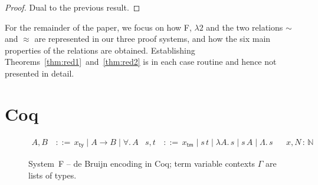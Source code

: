 \documentclass[a4paper,UKenglish]{lipics-v2016}
\makeatletter
\newcommand{\ms}{\,}
\newcommand{\mrel}[1]{\mathrel{\ms #1 \ms}}
\newcommand{\Nat}{\mathbb{N}}
\newcommand{\OF}{\mrel{:}}
\newcommand{\bnfdef}{\mrel{::=}}
\newcommand{\SysL}{$\lambda2$\xspace}
\newcommand{\ty}{\mathsf{ty}}
\newcommand{\tm}{\mathsf{tm}}
\newcommand{\cc}[2]{#1;#2} %
\newcommand{\raisemath}[1]{\mathpalette{\raisem@th{#1}}}
\newcommand{\raisem@th}[3]{\raisebox{#1}{\ensuremath{#2#3}}}
\newcommand{\tsAnnot}[2]{\vdash\hspace{-.7em}^{\raisemath{1.5pt}{\scriptscriptstyle{#2}}}_{\raisemath{0.3pt}{\scriptscriptstyle{#1}}}} %
\newcommand{\tfF}{\tsAnnot{\mathsf{F}}{\ty}}  %
\newcommand{\tyF}{\tsAnnot{\mathsf{F}}{\tm}}  %
\newcommand{\istyF}[2]{\ensuremath{{#1} \mathrel{\tfF} #2}}
\newcommand{\typingF}[3]{\ensuremath{{#1} \mathrel{\tyF} #2 \OF #3}}
\newcommand{\tyr}{\mathrel{\sim}}
\newcommand{\tmr}{\mathrel{\approx}}
\newcommand{\All}{\ensuremath{\forall.\,}}
\newcommand{\Lam}[1]{\ensuremath{\lambda #1.\,}}
\newcommand{\TyLam}{\ensuremath{\Lambda.\,}}
\newcommand{\subst}[1]{\hphantom{|}\!\![{#1}]}
\newcommand{\scons}{\mathbin{\cdot}}
\newcommand{\id}{\mathsf{id}}
\newcommand{\shift}{\ensuremath{\uparrow}}
\theoremstyle{plain}
\makeatother
\begin{document}
\begin{proof}
  Dual to the previous result.
\end{proof}

For the remainder of the paper, we focus on how F, \SysL and the two relations $\tyr$ and $\tmr$ are represented in our three proof systems, and how the six main properties of the relations are obtained.
Establishing Theorems~\ref{thm:red1}~and~\ref{thm:red2} is in each case routine and hence not presented in detail.

\section{Coq}
\label{sec:coq}

\begin{figure}
  \begin{center}
    \small
    \begin{align*}
      A, B &\bnfdef x_\ty \mid A \to B \mid \All A & s, t &\bnfdef x_\tm \mid s\,t \mid \Lam A s \mid s\,A \mid \TyLam s & &x, N \OF \Nat
    \end{align*}
    \vspace{-2.5em}
  \end{center}
  \caption{System~F -- de Bruijn encoding in Coq; term variable contexts $\Gamma$ are lists of types.\vspace{-1em}}
  \label{fig:sys-f-coq}
\end{figure}
\end{document}
